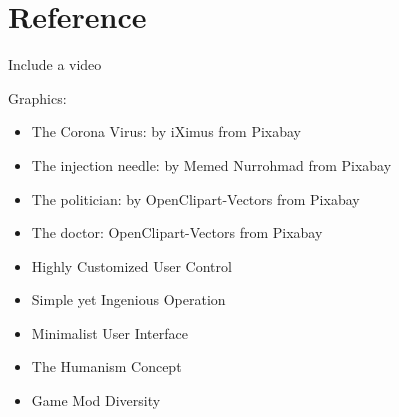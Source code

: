 \documentclass{beamer}
\begin{document}
\section{Reference}

\begin{frame}{Include a video}

	Graphics:
	\begin{itemize}\bigsep
		\item The Corona Virus: by iXimus from Pixabay
		\item The injection needle: by Memed Nurrohmad from Pixabay
		\item The politician: by OpenClipart-Vectors from Pixabay
		\item The doctor: OpenClipart-Vectors from Pixabay
	\end{itemize}

\end{frame}




\begin{framek}

\begin{itemize}\itemsep .5cm
		\item Highly Customized User Control
		\item Simple yet Ingenious Operation
		\item Minimalist User Interface
		\item The Humanism Concept
		\item Game Mod Diversity
	\end{itemize}

\end{framek}
\end{document}
